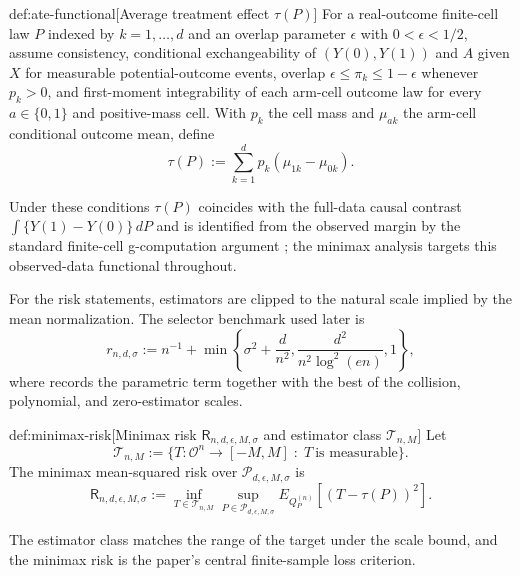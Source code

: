 \begin{definitionv}{def:ate-functional}[Average treatment effect \(\tau(P)\)]
For a real-outcome finite-cell law \(P\) indexed by \(k=1,\ldots,d\) and an overlap parameter \(\epsilon\) with \(0<\epsilon<1/2\), assume consistency, conditional exchangeability of \((Y(0),Y(1))\) and \(A\) given \(X\) for measurable potential-outcome events, overlap \(\epsilon\le \pi_k\le 1-\epsilon\) whenever \(p_k>0\), and first-moment integrability of each arm-cell outcome law for every \(a\in\{0,1\}\) and positive-mass cell. With \(p_k\) the cell mass and \(\mu_{ak}\) the arm-cell conditional outcome mean, define
\[
\tau(P)
:=
\sum_{k=1}^{d}p_k(\mu_{1k}-\mu_{0k}).
\]
\end{definitionv}

Under these conditions \(\tau(P)\) coincides with the full-data causal contrast \(\int\{Y(1)-Y(0)\}\,dP\) and is identified from the observed margin by the standard finite-cell g-computation argument \citep{Rubin1974,RosenbaumRubin1983,Robins1994,ImbensRubin2015}; the minimax analysis targets this observed-data functional throughout.

For the risk statements, estimators are clipped to the natural scale implied by the mean normalization. The selector benchmark used later is
\[
r_{n,d,\sigma}
:=
n^{-1}
+
\min\left\{
\sigma^2+\frac{d}{n^2},
\frac{d^2}{n^2\log^2(en)},
1
\right\},
\]
where  records the parametric term together with the best of the collision, polynomial, and zero-estimator scales.

\begin{definitionv}{def:minimax-risk}[Minimax risk \(\mathsf R_{n,d,\epsilon,M,\sigma}\) and estimator class \(\mathcal T_{n,M}\)]
Let
\[
\mathcal T_{n,M}
:=
\bigl\{
T:\mathcal O^n\to[-M,M]\;:\;T\ \text{is measurable}
\bigr\}.
\]
The minimax mean-squared risk over \(\mathcal P_{d,\epsilon,M,\sigma}\) is
\[
\mathsf R_{n,d,\epsilon,M,\sigma}
:=
\inf_{T\in\mathcal T_{n,M}}
\sup_{P\in\mathcal P_{d,\epsilon,M,\sigma}}
E_{Q_P^{(n)}}\!\left[(T-\tau(P))^2\right].
\]
\end{definitionv}

The estimator class  matches the range of the target under the scale bound, and the minimax risk  is the paper's central finite-sample loss criterion.

